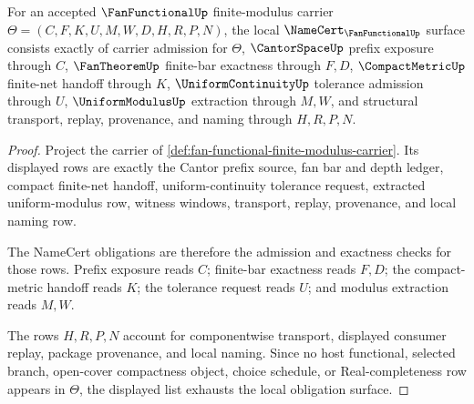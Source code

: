 \begin{theorem}
\label{thm:fan-functional-namecert-obligation-surface}
For an accepted $\FanFunctionalUp$ finite-modulus carrier $\Theta=(C,F,K,U,M,W,D,H,R,P,N)$, the local $\NameCert_{\FanFunctionalUp}$ surface consists exactly of carrier admission for $\Theta$, $\CantorSpaceUp$ prefix exposure through $C$, $\FanTheoremUp$ finite-bar exactness through $F,D$, $\CompactMetricUp$ finite-net handoff through $K$, $\UniformContinuityUp$ tolerance admission through $U$, $\UniformModulusUp$ extraction through $M,W$, and structural transport, replay, provenance, and naming through $H,R,P,N$.
\end{theorem}
\begin{proof}
Project the carrier of \autoref{def:fan-functional-finite-modulus-carrier}. Its displayed rows are exactly the Cantor prefix source, fan bar and depth ledger, compact finite-net handoff, uniform-continuity tolerance request, extracted uniform-modulus row, witness windows, transport, replay, provenance, and local naming row.

The NameCert obligations are therefore the admission and exactness checks for those rows. Prefix exposure reads $C$; finite-bar exactness reads $F,D$; the compact-metric handoff reads $K$; the tolerance request reads $U$; and modulus extraction reads $M,W$.

The rows $H,R,P,N$ account for componentwise transport, displayed consumer replay, package provenance, and local naming. Since no host functional, selected branch, open-cover compactness object, choice schedule, or Real-completeness row appears in $\Theta$, the displayed list exhausts the local obligation surface.
\end{proof}

